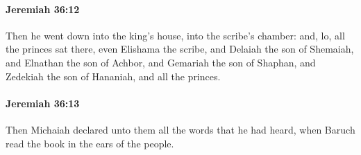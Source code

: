 		\paragraph{Jeremiah 36:12} %
			\label{JEREMIAH-36-12}

			Then he went down into the king’s house, into the scribe’s chamber: and, lo, all the princes sat there, even Elishama the scribe, and Delaiah the son of Shemaiah, and Elnathan the son of Achbor, and Gemariah the son of Shaphan, and Zedekiah the son of Hananiah, and all the princes.


		\paragraph{Jeremiah 36:13} %
			\label{JEREMIAH-36-13}

			Then Michaiah declared unto them all the words that he had heard, when Baruch read the book in the ears of the people.

